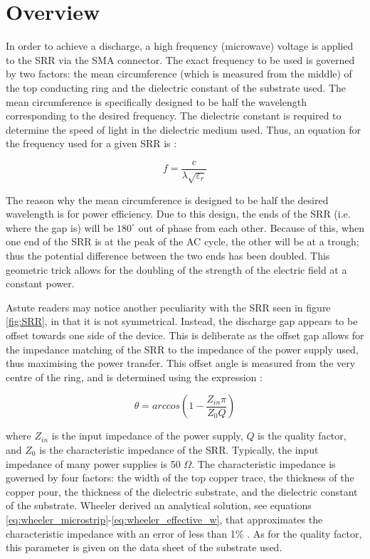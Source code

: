 \section{Overview}


In order to achieve a discharge, a high frequency (microwave) voltage is applied to the SRR via the SMA connector. The exact frequency to be used is governed by two factors: the mean circumference (which is measured from the middle) of the top conducting ring and the dielectric constant of the substrate used. The mean circumference is specifically designed to be half the wavelength corresponding to the desired frequency. The dielectric constant is required to determine the speed of light in the dielectric medium used. Thus, an equation for the frequency used for a given SRR is \cite{Dextre2017}:

\begin{equation}
     f = \frac{c}{\lambda\sqrt{\varepsilon_r}}
     \label{eq:resonant_frequency}
\end{equation}

The reason why the mean circumference is designed to be half the desired wavelength is for power efficiency. Due to this design, the ends of the SRR (i.e. where the gap is) will be $180^\circ$ out of phase from each other. Because of this, when one end of the SRR is at the peak of the AC cycle, the other will be at a trough; thus the potential difference between the two ends has been doubled. This geometric trick allows for the doubling of the strength of the electric field at a constant power. 

Astute readers may notice another peculiarity with the SRR seen in figure \ref{fig:SRR}, in that it is not symmetrical. Instead, the discharge gap appears to be offset towards one side of the device. This is deliberate as the offset gap allows for the impedance matching of the SRR to the impedance of the power supply used, thus maximising the power transfer. This offset angle is measured from the very centre of the ring, and is determined using the expression \cite{Iza2005}:

\begin{equation}
	\theta = arccos(1 - \frac{Z_{in} \pi}{Z_0 Q})
	\label{eq:offset_angle}
\end{equation}


where $Z_{in}$ is the input impedance of the power supply, $Q$ is the quality factor, and $Z_0$ is the characteristic impedance of the SRR. Typically, the input impedance of many power supplies is 50 $\Omega$. The characteristic impedance is governed by four factors: the width of the top copper trace, the thickness of the copper pour, the thickness of the dielectric substrate, and the dielectric constant of the substrate. Wheeler derived an analytical solution, see equations \ref{eq:wheeler_microstrip}-\ref{eq:wheeler_effective_w}, that approximates the characteristic impedance with an error of less than 1\% \cite{wheeler_1977}. As for the quality factor, this parameter is given on the data sheet of the substrate used.

